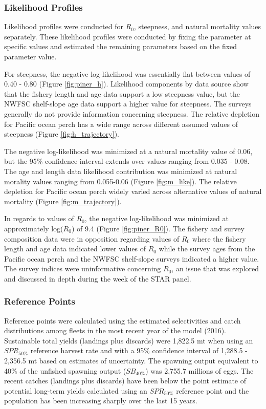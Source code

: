 \documentclass[12pt,]{article}
\begin{document}
\subsubsection{Likelihood Profiles}\label{likelihood-profiles}

Likelihood profiles were conducted for \(R_0\), steepness, and natural
mortality values separately. These likelihood profiles were conducted by
fixing the parameter at specific values and estimated the remaining
parameters based on the fixed parameter value.

For steepness, the negative log-likelihood was essentially flat between
values of 0.40 - 0.80 (Figure \ref{fig:piner_h}). Likelihood components
by data source show that the fishery length and age data support a low
steepness value, but the NWFSC shelf-slope age data support a higher
value for steepness. The surveys generally do not provide information
concerning steepness. The relative depletion for Pacific ocean perch has
a wide range across different assumed values of steepness (Figure
\ref{fig:h_trajectory}).

The negative log-likelihood was minimized at a natural mortality value
of 0.06, but the 95\% confidence interval extends over values ranging
from 0.035 - 0.08. The age and length data likelihood contribution was
minimized at natural morality values ranging from 0.055-0.06 (Figure
\ref{fig:m_like}). The relative depletion for Pacific ocean perch widely
varied across alternative values of natural mortality (Figure
\ref{fig:m_trajectory}).

In regards to values of \(R_0\), the negative log-likelihood was
minimized at approximately log(\(R_0\)) of 9.4 (Figure
\ref{fig:piner_R0}). The fishery and survey composition data were in
opposition regarding values of \(R_0\) where the fishery length and age
data indicated lower values of \(R_0\) while the survey ages from the
Pacific ocean perch and the NWFSC shelf-slope surveys indicated a higher
value. The survey indices were uninformative concerning \(R_0\), an
issue that was explored and discussed in depth during the week of the
STAR panel.

\subsubsection{Reference Points}\label{reference-points-1}

Reference points were calculated using the estimated selectivities and
catch distributions among fleets in the most recent year of the model
(2016). Sustainable total yields (landings plus discards) were 1,822.5
mt when using an \(SPR_{50\%}\) reference harvest rate and with a 95\%
confidence interval of 1,288.5 - 2,356.5 mt based on estimates of
uncertainty. The spawning output equivalent to 40\% of the unfished
spawning output (\(SB_{40\%}\)) was 2,755.7 millions of eggs. The recent
catches (landings plus discards) have been below the point estimate of
potential long-term yields calculated using an \(SPR_{50\%}\) reference
point and the population has been increasing sharply over the last 15
years.
\end{document}
